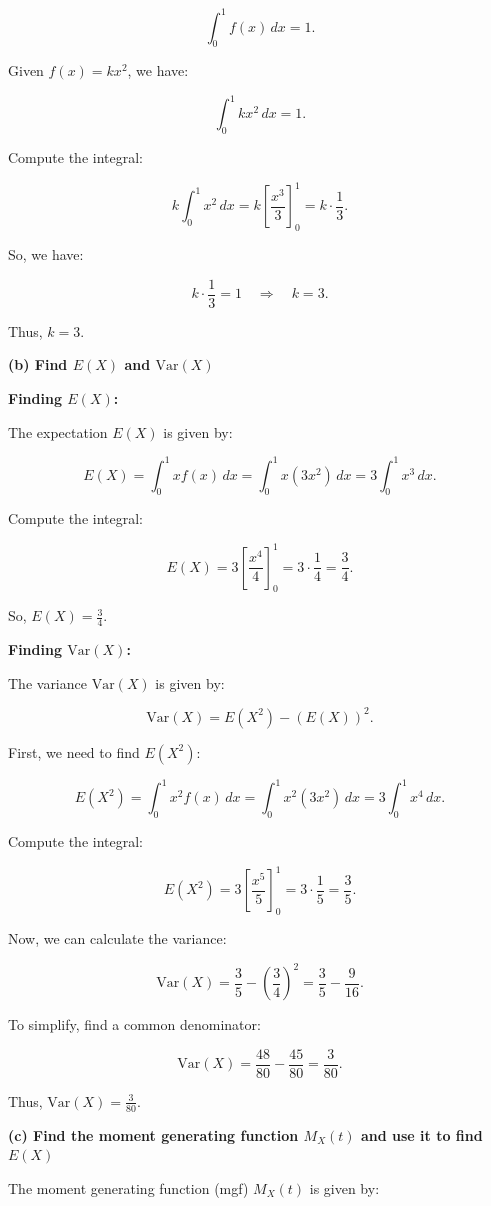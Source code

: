 \documentclass{article}
\begin{document}
\[
\int_0^1 f(x) \, dx = 1.
\]

Given \( f(x) = kx^2 \), we have:

\[
\int_0^1 kx^2 \, dx = 1.
\]

Compute the integral:

\[
k \int_0^1 x^2 \, dx = k \left[ \frac{x^3}{3} \right]_0^1 = k \cdot \frac{1}{3}.
\]

So, we have:

\[
k \cdot \frac{1}{3} = 1 \quad \Rightarrow \quad k = 3.
\]

Thus, \( k = 3 \).

\textbf{(b) Find \( E(X) \) and \( \text{Var}(X) \)}

\textbf{Finding \( E(X) \):}

The expectation \( E(X) \) is given by:

\[
E(X) = \int_0^1 x f(x) \, dx = \int_0^1 x (3x^2) \, dx = 3 \int_0^1 x^3 \, dx.
\]

Compute the integral:

\[
E(X) = 3 \left[ \frac{x^4}{4} \right]_0^1 = 3 \cdot \frac{1}{4} = \frac{3}{4}.
\]

So, \( E(X) = \frac{3}{4} \).

\textbf{Finding \( \text{Var}(X) \):}

The variance \( \text{Var}(X) \) is given by:

\[
\text{Var}(X) = E(X^2) - (E(X))^2.
\]

First, we need to find \( E(X^2) \):

\[
E(X^2) = \int_0^1 x^2 f(x) \, dx = \int_0^1 x^2 (3x^2) \, dx = 3 \int_0^1 x^4 \, dx.
\]

Compute the integral:

\[
E(X^2) = 3 \left[ \frac{x^5}{5} \right]_0^1 = 3 \cdot \frac{1}{5} = \frac{3}{5}.
\]

Now, we can calculate the variance:

\[
\text{Var}(X) = \frac{3}{5} - \left( \frac{3}{4} \right)^2 = \frac{3}{5} - \frac{9}{16}.
\]

To simplify, find a common denominator:

\[
\text{Var}(X) = \frac{48}{80} - \frac{45}{80} = \frac{3}{80}.
\]

Thus, \( \text{Var}(X) = \frac{3}{80} \).

\textbf{(c) Find the moment generating function \( M_X(t) \) and use it to find \( E(X) \)}

The moment generating function (mgf) \( M_X(t) \) is given by:
\end{document}
